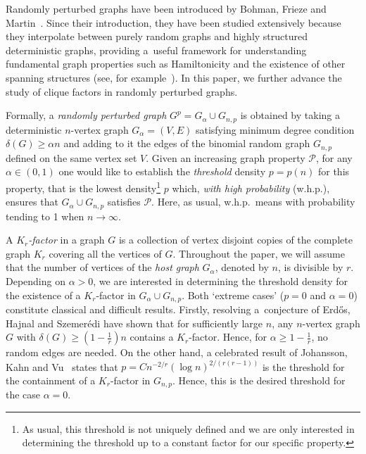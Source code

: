 \documentclass[reqno, 12pt]{amsart}
\numberwithin{equation}{section}
\numberwithin{figure}{section}
\theoremstyle{plain}
\theoremstyle{definition}
\def \Gnp{G_{n,p}}
\begin{document}
    Randomly perturbed graphs have been introduced by Bohman, Frieze and Martin~\cite{bfm03,bfm04}. Since their introduction, they have been studied extensively because they interpolate between purely random graphs and highly structured deterministic graphs, providing a~useful framework for understanding fundamental graph properties such as Hamiltonicity and the existence of other spanning structures (see, for example~\cite{adrrs21,balog16,bhkm19,bmpp20,jk20,kks17,kst06}). In this paper, we further advance the study of clique factors in randomly perturbed graphs.
    
    Formally, a \emph{randomly perturbed graph} $G^p = G_\alpha \cup \Gnp$ is obtained by taking a deterministic $n$-vertex graph $G_\alpha = (V, E)$ satisfying minimum degree condition $\delta(G)\geq \alpha n$ and adding to it the edges of the binomial random graph $\Gnp$ defined on the same vertex set $V$. Given an increasing graph property $\mathcal{P}$, for any $\alpha\in(0,1)$ one would like to establish the \emph{threshold} density $p=p(n)$ for this property, that is the lowest density\footnote{As usual, this threshold is not uniquely defined and we are only interested in determining the threshold up to a constant factor for our specific property.} $p$ which, \emph{with high probability} (w.h.p.), ensures that $G_\alpha \cup \Gnp$ satisfies $\mathcal{P}$. Here, as usual, w.h.p.~means with probability tending to 1 when $n\rightarrow\infty$.

    A \emph{$K_r$-factor} in a graph $G$ is a collection of vertex disjoint copies of the complete graph $K_r$ covering all the vertices of $G$. Throughout the paper, we will assume that the number of vertices of the \emph{host graph} $G_\alpha$, denoted by $n$, is divisible by $r$. Depending on $\alpha >0$, we are interested in  determining the threshold density for the existence of a $K_r$-factor in $G_\alpha \cup \Gnp$. Both `extreme cases' ($p=0$ and $\alpha=0$) constitute classical and difficult results. Firstly, resolving a~conjecture of Erd\H os, Hajnal and Szemer\'edi \cite{Hajnal1970} have shown that for sufficiently large $n$, any $n$-vertex graph $G$ with $\delta(G) \geq \left(1-\frac{1}{r} \right)n$ contains a $K_r$-factor. Hence, for $\alpha \geq 1- \frac 1r$, no random edges are needed. On the other hand, a celebrated result of Johansson, Kahn and Vu~\cite{jkv08} states that $p = Cn^{-2/r}(\log n)^{2/(r(r-1))}$ is the threshold for the containment of a $K_r$-factor in $\Gnp$. Hence, this is the desired threshold for the case $\alpha=0$.
\end{document}
